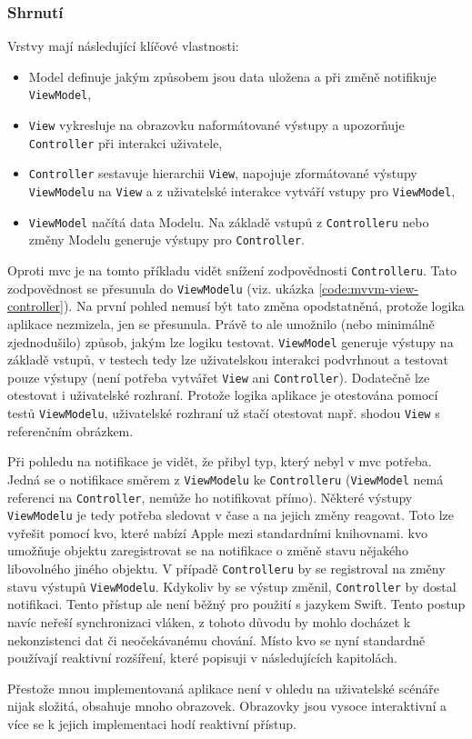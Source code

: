 \subsubsection*{Shrnutí} \label{architektura-mvvm-shrnuti}

Vrstvy mají následující klíčové vlastnosti:
\begin{itemize}
  \item Model definuje jakým způsobem jsou data uložena a při změně notifikuje \texttt{ViewModel},
  \item \texttt{View} vykresluje na obrazovku naformátované výstupy a upozorňuje \texttt{Controller} při interakci uživatele,
  \item \texttt{Controller} sestavuje hierarchii \texttt{View}, napojuje zformátované výstupy \texttt{ViewModelu} na \texttt{View} a z uživatelské interakce vytváří vstupy pro \texttt{ViewModel},
  \item \texttt{ViewModel} načítá data Modelu. Na základě vstupů z \texttt{Controlleru} nebo změny Modelu generuje výstupy pro \texttt{Controller}.
\end{itemize}

Oproti \acrshort{mvc} je na tomto příkladu vidět snížení zodpovědnosti \texttt{Controlleru}.
Tato zodpovědnost se přesunula do \texttt{ViewModelu} (viz. ukázka \ref{code:mvvm-view-controller}).
Na první pohled nemusí být tato změna opodstatněná, protože logika aplikace nezmizela, jen se přesunula.
Právě to ale umožnilo (nebo minimálně zjednodušilo) způsob, jakým lze logiku testovat.
\texttt{ViewModel} generuje výstupy na základě vstupů, v testech tedy lze uživatelskou interakci podvrhnout a testovat pouze výstupy (není potřeba vytvářet \texttt{View} ani \texttt{Controller}).
Dodatečně lze otestovat i uživatelské rozhraní.
Protože logika aplikace je otestována pomocí testů \texttt{ViewModelu}, uživatelské rozhraní už stačí otestovat např. shodou \texttt{View} s referenčním obrázkem.


Při pohledu na notifikace je vidět, že přibyl typ, který nebyl v \acrshort{mvc} potřeba.
Jedná se o notifikace směrem z \texttt{ViewModelu} ke \texttt{Controlleru} (\texttt{ViewModel} nemá referenci na \texttt{Controller}, nemůže ho notifikovat přímo).
Některé výstupy \texttt{ViewModelu} je tedy potřeba sledovat v čase a na jejich změny reagovat.
Toto lze vyřešit pomocí \acrfull{kvo}, které nabízí Apple mezi standardními knihovnami.
\acrshort{kvo} umožňuje objektu zaregistrovat se na notifikace o změně stavu nějakého libovolného jiného objektu.
V případě \texttt{Controlleru} by se registroval na změny stavu výstupů \texttt{ViewModelu}.
Kdykoliv by se výstup změnil, \texttt{Controller} by dostal notifikaci.
Tento přístup ale není běžný pro použití s jazykem Swift.
Tento postup navíc neřeší synchronizaci vláken, z tohoto důvodu by mohlo docházet k nekonzistenci dat či neočekávanému chování.
Místo \acrshort{kvo} se nyní standardně používají reaktivní rozšíření, které popisuji v následujících kapitolách.

Přestože mnou implementovaná aplikace není v ohledu na uživatelské scénáře nijak složitá, obsahuje mnoho obrazovek.
Obrazovky jsou vysoce interaktivní a více se k jejich implementaci hodí reaktivní přístup.
